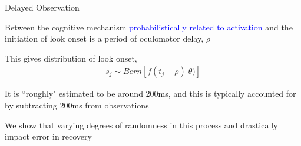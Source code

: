 \documentclass{beamer}
\DeclareMathOperator*{\argmin}{arg\!\min}
\newcommand{\vp}{\vspace{2mm}}
\providecommand{\cn}[1]{\textcolor{blue}{#1}}
\begin{document}
%
%
%
%


\begin{frame}{Delayed Observation}\large

Between the cognitive mechanism \cn{probabilistically related to activation} and the initiation of look onset is a period of oculomotor delay, $\rho$ \vp

This gives distribution of look onset,
\vspace{-1mm}
\begin{align*}
s_j \sim Bern \left[f(t_j - \rho) | \theta)\right]
\end{align*}

It is ``roughly" estimated to be around 200ms, and this is typically accounted for by subtracting 200ms from observations \vp



We show that varying degrees of randomness in this process and drastically impact error in recovery

\end{frame}
%
%
%
%
%
%
\end{document}
